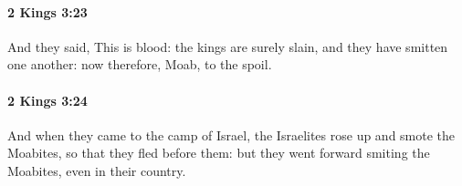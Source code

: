 		\paragraph{2 Kings 3:23} %
			\label{2KINGS-3-23}

			And they said, This is blood: the kings are surely slain, and they have smitten one another: now therefore, Moab, to the spoil.


		\paragraph{2 Kings 3:24} %
			\label{2KINGS-3-24}

			And when they came to the camp of Israel, the Israelites rose up and smote the Moabites, so that they fled before them: but they went forward smiting the Moabites, even in their country.


